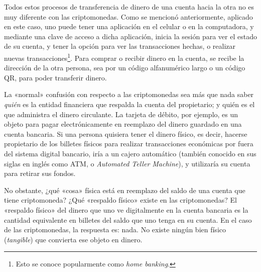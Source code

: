 \documentclass[12pt,a4paper,twoside]{book}
\begin{document}
Todos estos procesos de transferencia de dinero de una cuenta hacia la otra no es muy diferente con las criptomonedas. Como se mencionó anteriormente, aplicado en este caso, uno puede tener una aplicación en el celular o en la computadora, y mediante una clave de acceso a dicha aplicación, inicia la sesión para ver el estado de su cuenta, y tener la opción para ver las transacciones hechas, o realizar nuevas transacciones\footnote{Esto se conoce popularmente como \textit{home banking}.}. Para comprar o recibir dinero en la cuenta, se recibe la dirección de la otra persona, sea por un código alfanumérico largo o un código QR, para poder transferir dinero.

La «normal» confusión con respecto a las criptomonedas sea más que nada saber \textit{quién} es la entidad financiera que respalda la cuenta del propietario; y quién es el que administra el dinero circulante. La tarjeta de débito, por ejemplo, es un objeto para pagar electrónicamente en reemplazo del dinero guardado en una cuenta bancaria. Si una persona quisiera tener el dinero físico, es decir, hacerse propietario de los billetes físicos para realizar transacciones económicas por fuera del sistema digital bancario, iría a un cajero automático (también conocido en sus siglas en inglés como ATM, o \textit{Automated Teller Machine}), y utilizaría su cuenta para retirar sus fondos.

No obstante, ¿qué «cosa» física está en reemplazo del saldo de una cuenta que tiene criptomoneda? ¿Qué «respaldo físico» existe en las criptomonedas? El «respaldo físico» del dinero que uno ve digitalmente en la cuenta bancaria es la cantidad equivalente en billetes del saldo que uno tenga en su cuenta. En el caso de las criptomonedas, la respuesta es: nada. No existe ningún bien físico (\textit{tangible}) que convierta ese objeto en dinero.
\end{document}
